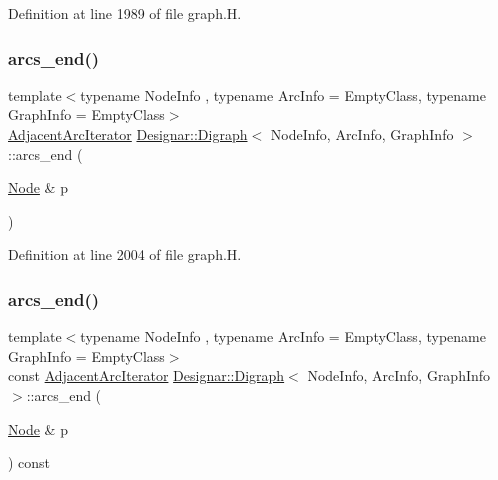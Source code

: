 Definition at line 1989 of file graph.\+H.

\mbox{\label{class_designar_1_1_digraph_ab7e47c93dd15bab0510977f403a35849}} 
\subsubsection{\texorpdfstring{arcs\+\_\+end()}{arcs\_end()}\hspace{0.1cm}{\footnotesize\ttfamily [3/4]}}
{\footnotesize\ttfamily template$<$typename Node\+Info , typename Arc\+Info  = Empty\+Class, typename Graph\+Info  = Empty\+Class$>$ \\
\hyperlink{class_designar_1_1_digraph_1_1_adjacent_arc_iterator}{Adjacent\+Arc\+Iterator} \hyperlink{class_designar_1_1_digraph}{Designar\+::\+Digraph}$<$ Node\+Info, Arc\+Info, Graph\+Info $>$\+::arcs\+\_\+end (\begin{DoxyParamCaption}\item[{\hyperlink{class_designar_1_1_digraph_a4dc921c41a480b7946a04170e997d8ae}{Node} \&}]{p }\end{DoxyParamCaption})\hspace{0.3cm}{\ttfamily [inline]}}



Definition at line 2004 of file graph.\+H.

\mbox{\label{class_designar_1_1_digraph_a68abe34d6f5a7b429715ec55aa030b7d}} 
\subsubsection{\texorpdfstring{arcs\+\_\+end()}{arcs\_end()}\hspace{0.1cm}{\footnotesize\ttfamily [4/4]}}
{\footnotesize\ttfamily template$<$typename Node\+Info , typename Arc\+Info  = Empty\+Class, typename Graph\+Info  = Empty\+Class$>$ \\
const \hyperlink{class_designar_1_1_digraph_1_1_adjacent_arc_iterator}{Adjacent\+Arc\+Iterator} \hyperlink{class_designar_1_1_digraph}{Designar\+::\+Digraph}$<$ Node\+Info, Arc\+Info, Graph\+Info $>$\+::arcs\+\_\+end (\begin{DoxyParamCaption}\item[{\hyperlink{class_designar_1_1_digraph_a4dc921c41a480b7946a04170e997d8ae}{Node} \&}]{p }\end{DoxyParamCaption}) const\hspace{0.3cm}{\ttfamily [inline]}}



